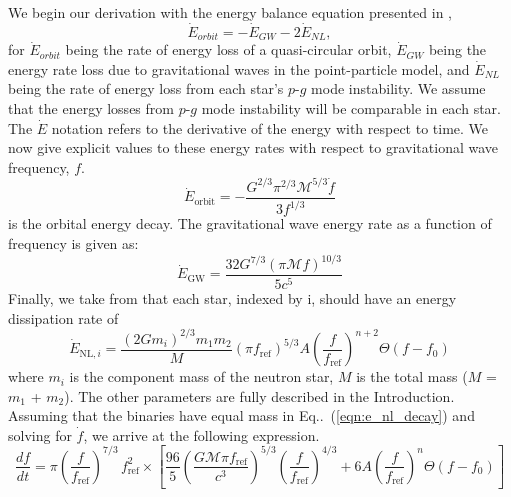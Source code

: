 We begin our derivation with the energy balance equation presented in \cite{Essick:2016tkn},
\begin{equation}\label{eqn_app:energy_bal}
\dot{E}_{orbit} = -\dot{E}_{GW} - 2 \dot{E}_{NL},
\end{equation}
for $\dot{E}_{orbit}$ being the rate of energy loss of a quasi-circular orbit, $\dot{E}_{GW}$ being the energy rate loss due to gravitational waves in the point-particle model, and $\dot{E}_{NL}$ being the rate of energy loss from each star's $p$-$g$ mode instability. We assume that the energy losses from $p$-$g$ mode instability will be comparable in each star. The $\dot{E}$ notation refers to the derivative of the energy with respect to time. We now give explicit values to these energy rates with respect to gravitational wave frequency, $f$.
\begin{equation}\label{eqn:e_orbit_decay}
\dot{E}_{\mathrm{orbit}} = - \frac{G^{2/3} \pi^{2/3} \mathcal{M}^{5/3} \dot{f}}{3 f^{1/3}}
\end{equation}
is the orbital energy decay. The gravitational wave energy rate as a function of frequency is given as:
\begin{equation}\label{eqn:e_gw_decay}
\dot{E}_{\mathrm{GW}} = \frac{32 G^{7/3} \left(\pi \mathcal{M} f\right)^{10/3}}{5 c^5}
\end{equation}
Finally, we take from \cite{Essick:2016tkn} that each star, indexed by i, should have an energy dissipation rate of
\begin{equation}\label{eqn:e_nl_decay}
\dot{E}_{\mathrm{NL}, i} = \frac{(2G m_i)^{2/3}m_1 m_2}{M} (\pi f_{\mathrm{ref}})^{5/3} A \left (\frac{f}{f_{\mathrm{ref}}} \right )^{n+2} \Theta(f - f_0) 
\end{equation}
where $m_i$ is the component mass of the neutron star, $M$ is the total mass ($M$ = $m_1$ + $m_2$). The other parameters are fully described in the Introduction. Assuming that the binaries have equal mass in Eq..~(\ref{eqn:e_nl_decay}) and solving for $\dot{f}$, we arrive at the following expression.
\begin{equation}\label{eqn:f_dot}
\frac{df}{dt} =  \pi \left ( \frac{f}{f_{\mathrm{ref}}} \right )^{7/3} \, f_{\mathrm{ref}}^2 \times \left [ \frac{96}{5} \left ( \frac{G \mathcal{M} \pi f_{\mathrm{ref}}}{c^3}\right )^{5/3} \left (\frac{f}{f_{\mathrm{ref}}} \right )^{4/3} + 6 A \left (\frac{f}{f_{\mathrm{ref}}} \right )^{n} \Theta(f - f_0) \right ]
\end{equation}

